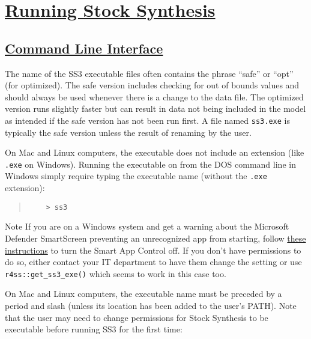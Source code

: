 \section[Running Stock Synthesis]{\protect\hyperref[sec:RunningSS3]{Running Stock Synthesis}} \label{sec:RunningSS3}

\hypertarget{CommandLine}{}
\subsection[Command Line Interface]{\protect\hyperlink{CommandLine}{Command Line Interface}}
The name of the SS3 executable files often contains the phrase ``safe'' or ``opt'' (for optimized). The safe version includes checking for out of bounds values and should always be used whenever there is a change to the data file. The optimized version runs slightly faster but can result in data not being included in the model as intended if the safe version has not been run first. A file named \texttt{ss3.exe} is typically the safe version unless the result of renaming by the user.

On Mac and Linux computers, the executable does not include an extension (like \texttt{.exe} on Windows).
Running the executable on from the DOS command line in Windows simply require typing the executable name (without the \texttt{.exe} extension):
\begin{quote}
	\begin{verbatim}
	> ss3
	\end{verbatim}
\end{quote}

\begin{mybox}{Note}
If you are on a Windows system and get a warning about the Microsoft Defender SmartScreen preventing an unrecognized app from starting, follow \href{https://answers.microsoft.com/en-us/windows/forum/all/how-to-change-the-mode-of-smart-app-control-from/399a276f-5585-40fe-b72d-c014cac82b32}{these instructions} to turn the Smart App Control off. If you don't have permissions to do so, either contact your IT department to have them change the setting or use \texttt{r4ss::get\_ss3\_exe()} which seems to work in this case too.
\end{mybox}

On Mac and Linux computers, the executable name must be preceded by a period and slash (unless its location has been added to the user's PATH). Note that the user may need to change permissions for Stock Synthesis to be executable before running SS3 for the first time:

